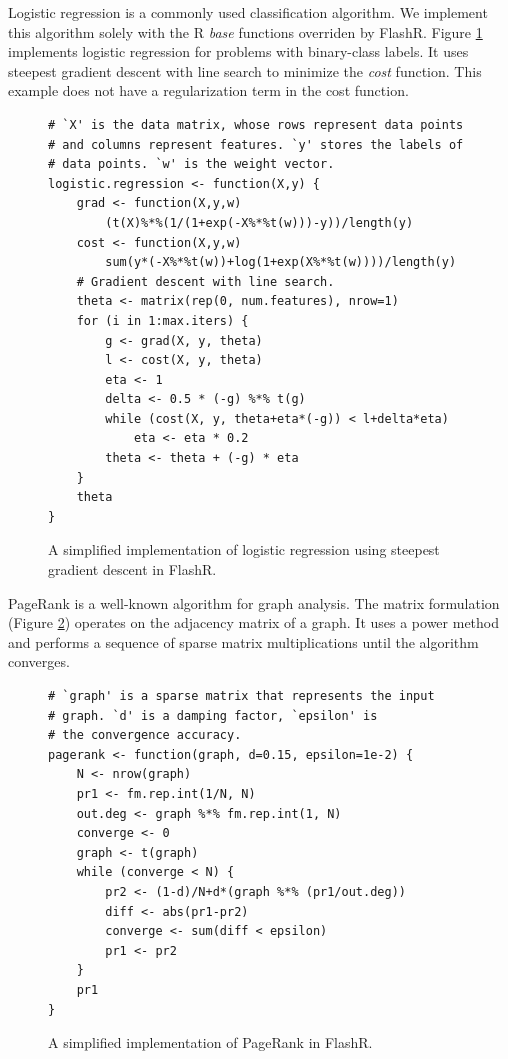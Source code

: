 Logistic regression is a commonly used classification algorithm.
We implement this algorithm solely with the R \textit{base} functions
overriden by FlashR. Figure
\ref{logistic} implements logistic regression for problems with binary-class
labels. It uses steepest gradient descent with line search to minimize
the \textit{cost} function. This example does not have a regularization term
in the cost function.
\begin{figure}
\begin{verbatim}
# `X' is the data matrix, whose rows represent data points
# and columns represent features. `y' stores the labels of
# data points. `w' is the weight vector.
logistic.regression <- function(X,y) {
	grad <- function(X,y,w)
		(t(X)%*%(1/(1+exp(-X%*%t(w)))-y))/length(y)
	cost <- function(X,y,w)
		sum(y*(-X%*%t(w))+log(1+exp(X%*%t(w))))/length(y)
	# Gradient descent with line search.
	theta <- matrix(rep(0, num.features), nrow=1)
	for (i in 1:max.iters) {
		g <- grad(X, y, theta)
		l <- cost(X, y, theta)
		eta <- 1
		delta <- 0.5 * (-g) %*% t(g)
		while (cost(X, y, theta+eta*(-g)) < l+delta*eta)
			eta <- eta * 0.2
		theta <- theta + (-g) * eta
	}
	theta
}
\end{verbatim}
\caption{A simplified implementation of logistic regression using
steepest gradient descent in FlashR.}
\label{logistic}
\vspace{-10pt}
\end{figure}

PageRank is a well-known algorithm for graph analysis. The matrix formulation
(Figure \ref{pagerank}) operates on the adjacency matrix of a graph. It uses
a power method and performs a sequence of sparse matrix multiplications until
the algorithm converges.
\begin{figure}
\begin{verbatim}
# `graph' is a sparse matrix that represents the input
# graph. `d' is a damping factor, `epsilon' is
# the convergence accuracy.
pagerank <- function(graph, d=0.15, epsilon=1e-2) {
	N <- nrow(graph)
	pr1 <- fm.rep.int(1/N, N)
	out.deg <- graph %*% fm.rep.int(1, N)
	converge <- 0
	graph <- t(graph)
	while (converge < N) {
		pr2 <- (1-d)/N+d*(graph %*% (pr1/out.deg))
		diff <- abs(pr1-pr2)
		converge <- sum(diff < epsilon)
		pr1 <- pr2
	}
	pr1
}
\end{verbatim}
\caption{A simplified implementation of PageRank in FlashR.}
\label{pagerank}
\vspace{-10pt}
\end{figure}
